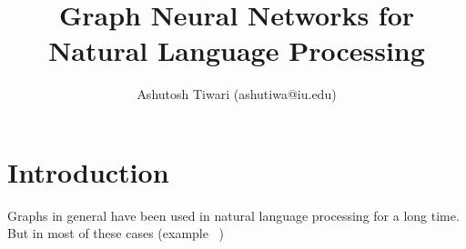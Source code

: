 \documentclass{article}
\title{\textbf{Graph Neural Networks for Natural Language Processing}}
\author{Ashutosh Tiwari (ashutiwa@iu.edu)}
\begin{document}
\maketitle

\section{Introduction}

    Graphs in general have been used in natural language processing for a long time. But in most of these cases (example ~\cite{erkan-2006-language})






\end{document}
